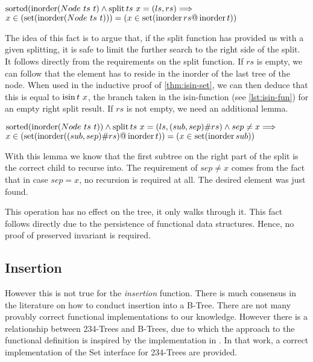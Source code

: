 \begin{lemma}
    $\operatorname{sorted} (\operatorname{inorder} (Node\ ts\ t) \wedge \operatorname{split} ts\ x = (ls, rs) \Longrightarrow$ \\
    $x \in (\operatorname{set} (\operatorname{inorder} (Node\ ts\ t))) = (x \in \operatorname{set} (\operatorname{inorder} rs @ \operatorname{inorder} t))$
\end{lemma}

The idea of this fact is to argue that, if the split function has provided
us with a given splitting, it is safe to limit the further search
to the right side of the split.
It follows directly from the requirements on the split function.
If $rs$ is empty, we can follow that the element has to reside in the inorder
of the last tree of the node.
When used in the inductive proof of \autoref{thm:isin-set}, we can then deduce that this is
equal to $\operatorname{isin} t\ x$, the branch taken in the isin-function (see \autoref{lst:isin-fun}) for an empty right split result.
If $rs$ is not empty, we need an additional lemma.

\begin{lemma}
    $\operatorname{sorted} (\operatorname{inorder} (Node\ ts\ t)) \wedge \operatorname{split} ts\ x = (ls, (sub,sep)\#rs) \wedge sep \neq x \Longrightarrow$ \\
    $x \in (\operatorname{set} (\operatorname{inorder} ((sub,sep)\#rs) @ \operatorname{inorder} t)) = (x \in \operatorname{set} (\operatorname{inorder} sub))$
\end{lemma}

With this lemma we know that the first subtree on the right part of the split
is the correct child to recurse into.
The requirement of $sep \neq x$ comes from the fact that in case $sep = x$,
no recursion is required at all.
The desired element was just found.

This operation has no effect on the tree, it only walks through it.
This fact follows directly due to the persistence of functional data structures.
Hence, no proof of preserved invariant is required.

\subsection{Insertion}

However this is not true for the \textit{insertion} function.
There is much consensus in the literature on how to conduct insertion into a B-Tree.
There are not many provably correct functional implementations to our knowledge.
However there is a relationship between 234-Trees and B-Trees,
due to which the approach to the functional definition is inspired by the implementation
in \parencite{DBLP:conf/itp/Nipkow16}.
In that work, a correct implementation of the Set interface for 234-Trees 
are provided.

